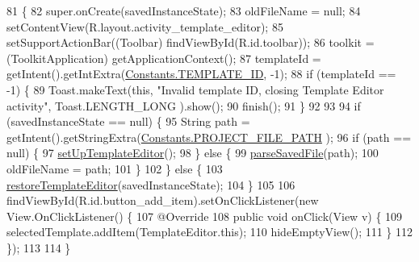 \begin{DoxyCode}
81                                                        \{
82         super.onCreate(savedInstanceState);
83         oldFileName = null;
84         setContentView(R.layout.activity\_template\_editor);
85         setSupportActionBar((Toolbar) findViewById(R.id.toolbar));
86         toolkit = (ToolkitApplication) getApplicationContext();
87         templateId = getIntent().getIntExtra(\hyperlink{classorg_1_1buildmlearn_1_1toolkit_1_1constant_1_1Constants_a2ee9d59d6a353dc4664ed2e2086dae9d}{Constants.TEMPLATE\_ID}, -1);
88         \textcolor{keywordflow}{if} (templateId == -1) \{
89             Toast.makeText(\textcolor{keyword}{this}, \textcolor{stringliteral}{"Invalid template ID, closing Template Editor activity"}, Toast.LENGTH\_LONG
      ).show();
90             finish();
91         \}
92 
93 
94         \textcolor{keywordflow}{if} (savedInstanceState == null) \{
95             String path = getIntent().getStringExtra(\hyperlink{classorg_1_1buildmlearn_1_1toolkit_1_1constant_1_1Constants_ab2586e8aa144cd7e8b4928186d709ea8}{Constants.PROJECT\_FILE\_PATH}
      );
96             \textcolor{keywordflow}{if} (path == null) \{
97                 \hyperlink{classorg_1_1buildmlearn_1_1toolkit_1_1activity_1_1TemplateEditor_a064ac90668a94f32256938cb08fe896e}{setUpTemplateEditor}();
98             \} \textcolor{keywordflow}{else} \{
99                 \hyperlink{classorg_1_1buildmlearn_1_1toolkit_1_1activity_1_1TemplateEditor_aef3001b6ab6df927e92ada78c02bc7da}{parseSavedFile}(path);
100                 oldFileName = path;
101             \}
102         \} \textcolor{keywordflow}{else} \{
103             \hyperlink{classorg_1_1buildmlearn_1_1toolkit_1_1activity_1_1TemplateEditor_a957831b300058bc26fbfc187517962a8}{restoreTemplateEditor}(savedInstanceState);
104         \}
105 
106         findViewById(R.id.button\_add\_item).setOnClickListener(\textcolor{keyword}{new} View.OnClickListener() \{
107             @Override
108             \textcolor{keyword}{public} \textcolor{keywordtype}{void} onClick(View v) \{
109                 selectedTemplate.addItem(TemplateEditor.this);
110                 hideEmptyView();
111             \}
112         \});
113 
114     \}
\end{DoxyCode}
